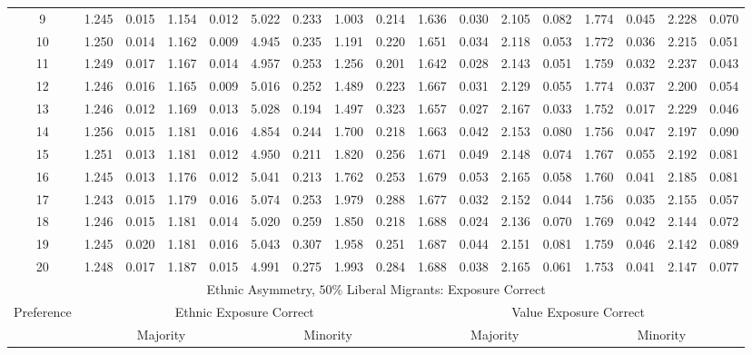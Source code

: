\documentclass{article}
\begin{document}
\begin{table}[H]
{\begin{tabular}{|c|c|c|c|c|c|c|c|c|c|c|c|c|c|c|c|c|}
     9 & 1.245 & 0.015 & 1.154 & 0.012 & 5.022 & 0.233 & 1.003 & 0.214 & 1.636 & 0.030 & 2.105 & 0.082 & 1.774 & 0.045 & 2.228 & 0.070 \\ 
    10 & 1.250 & 0.014 & 1.162 & 0.009 & 4.945 & 0.235 & 1.191 & 0.220 & 1.651 & 0.034 & 2.118 & 0.053 & 1.772 & 0.036 & 2.215 & 0.051 \\ 
    11 & 1.249 & 0.017 & 1.167 & 0.014 & 4.957 & 0.253 & 1.256 & 0.201 & 1.642 & 0.028 & 2.143 & 0.051 & 1.759 & 0.032 & 2.237 & 0.043 \\ 
    12 & 1.246 & 0.016 & 1.165 & 0.009 & 5.016 & 0.252 & 1.489 & 0.223 & 1.667 & 0.031 & 2.129 & 0.055 & 1.774 & 0.037 & 2.200 & 0.054 \\ 
    13 & 1.246 & 0.012 & 1.169 & 0.013 & 5.028 & 0.194 & 1.497 & 0.323 & 1.657 & 0.027 & 2.167 & 0.033 & 1.752 & 0.017 & 2.229 & 0.046 \\ 
    14 & 1.256 & 0.015 & 1.181 & 0.016 & 4.854 & 0.244 & 1.700 & 0.218 & 1.663 & 0.042 & 2.153 & 0.080 & 1.756 & 0.047 & 2.197 & 0.090 \\ 
    15 & 1.251 & 0.013 & 1.181 & 0.012 & 4.950 & 0.211 & 1.820 & 0.256 & 1.671 & 0.049 & 2.148 & 0.074 & 1.767 & 0.055 & 2.192 & 0.081 \\ 
    16 & 1.245 & 0.013 & 1.176 & 0.012 & 5.041 & 0.213 & 1.762 & 0.253 & 1.679 & 0.053 & 2.165 & 0.058 & 1.760 & 0.041 & 2.185 & 0.081 \\ 
    17 & 1.243 & 0.015 & 1.179 & 0.016 & 5.074 & 0.253 & 1.979 & 0.288 & 1.677 & 0.032 & 2.152 & 0.044 & 1.756 & 0.035 & 2.155 & 0.057 \\ 
    18 & 1.246 & 0.015 & 1.181 & 0.014 & 5.020 & 0.259 & 1.850 & 0.218 & 1.688 & 0.024 & 2.136 & 0.070 & 1.769 & 0.042 & 2.144 & 0.072 \\ 
    19 & 1.245 & 0.020 & 1.181 & 0.016 & 5.043 & 0.307 & 1.958 & 0.251 & 1.687 & 0.044 & 2.151 & 0.081 & 1.759 & 0.046 & 2.142 & 0.089 \\ 
    20 & 1.248 & 0.017 & 1.187 & 0.015 & 4.991 & 0.275 & 1.993 & 0.284 & 1.688 & 0.038 & 2.165 & 0.061 & 1.753 & 0.041 & 2.147 & 0.077 \\ 
   \hline
  \multicolumn{17}{|c|}{Ethnic Asymmetry, $50 \%$ Liberal Migrants: Exposure Correct}  \\\hline
 Preference &  \multicolumn{8}{|c|}{Ethnic Exposure Correct} & \multicolumn{8}{|c|}{Value Exposure Correct}   \\\hline
 & \multicolumn{4}{|c|}{Majority} & \multicolumn{4}{|c|}{Minority}  & \multicolumn{4}{|c|}{Majority} & \multicolumn{4}{|c|}{Minority}  \\

\end{tabular}}
\end{table}
\end{document}

